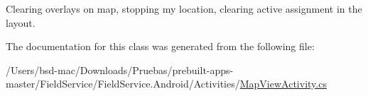 Clearing overlays on map, stopping my location, clearing active assignment in the layout. 



The documentation for this class was generated from the following file\+:\begin{DoxyCompactItemize}
\item 
/\+Users/bsd-\/mac/\+Downloads/\+Pruebas/prebuilt-\/apps-\/master/\+Field\+Service/\+Field\+Service.\+Android/\+Activities/\hyperlink{_map_view_activity_8cs}{Map\+View\+Activity.\+cs}\end{DoxyCompactItemize}
